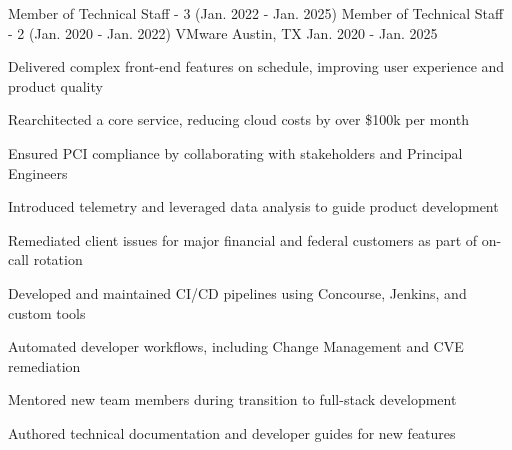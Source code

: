 \begin{cventryroles}
  \cventryroles
    {Member of Technical Staff - 3 (Jan. 2022 - Jan. 2025)}
    {Member of Technical Staff - 2 (Jan. 2020 - Jan. 2022)}
    {VMware} %
    {Austin, TX} %
    {Jan. 2020 - Jan. 2025}
    {
      \begin{cvitems}
        \item {Delivered complex front-end features on schedule, improving user experience and product quality}
        \item {Rearchitected a core service, reducing cloud costs by over \$100k per month}
        \item {Ensured PCI compliance by collaborating with stakeholders and Principal Engineers}
        \item {Introduced telemetry and leveraged data analysis to guide product development}
        \item {Remediated client issues for major financial and federal customers as part of on-call rotation}
        \item {Developed and maintained CI/CD pipelines using Concourse, Jenkins, and custom tools}
        \item {Automated developer workflows, including Change Management and CVE remediation}
        \item {Mentored new team members during transition to full-stack development}
        \item {Authored technical documentation and developer guides for new features}
      \end{cvitems}
    }
\end{cventryroles}
